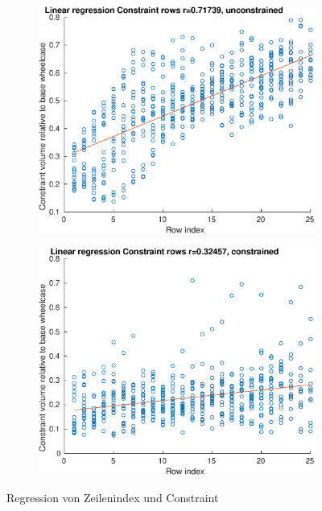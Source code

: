 \begin{figure}[h]
	\centering
	\begin{subfigure}[t]{0.5\textwidth}
		\centering
		\includegraphics[width=1\linewidth]{bilder/6pt1000Samples/conRegressionUnconRow}
	\end{subfigure}\hfill
	\begin{subfigure}[t]{0.5\textwidth}
		\centering
		\includegraphics[width=1\linewidth]{bilder/6pt1000Samples/conRegressionConRow}
	\end{subfigure}
	\caption{Regression von Zeilenindex und Constraint}
	\label{fig:regConRow}
\end{figure}

